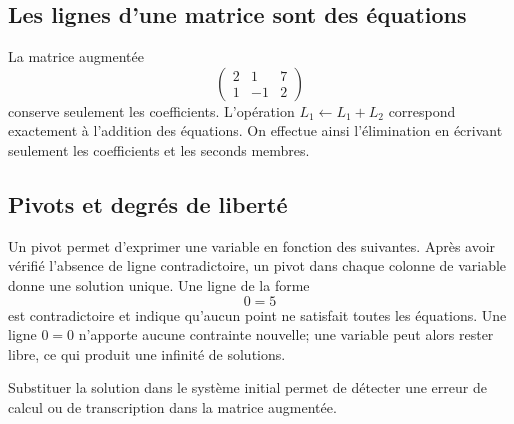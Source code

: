 \begin{center}
\end{center}

\subsection{Les lignes d'une matrice sont des équations}
La matrice augmentée
\[
\left(\begin{array}{cc|c}2&1&7\\1&-1&2\end{array}\right)
\]
conserve seulement les coefficients. L'opération $L_1\leftarrow L_1+L_2$ correspond exactement à l'addition des équations. On effectue ainsi l'élimination en écrivant seulement les coefficients et les seconds membres.

\subsection{Pivots et degrés de liberté}
Un pivot permet d'exprimer une variable en fonction des suivantes. Après avoir vérifié l'absence de ligne contradictoire, un pivot dans chaque colonne de variable donne une solution unique. Une ligne de la forme
\[
0=5
\]
est contradictoire et indique qu'aucun point ne satisfait toutes les équations. Une ligne $0=0$ n'apporte aucune contrainte nouvelle; une variable peut alors rester libre, ce qui produit une infinité de solutions.

\begin{visualbox}
Substituer la solution dans le système initial permet de détecter une erreur de calcul ou de transcription dans la matrice augmentée.
\end{visualbox}



